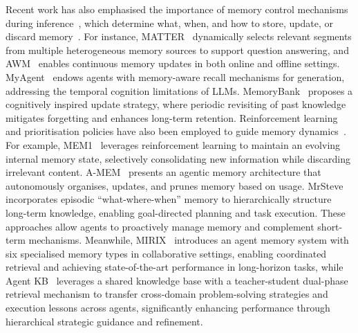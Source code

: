 \documentclass[]{selfevolagent}
\theoremstyle{plain}
\theoremstyle{definition}
\theoremstyle{remark}
\begin{document}
Recent work has also emphasised the importance of memory control mechanisms during inference~\citep{10756271, chen2025improvingfactualityexplicitworking}, which determine what, when, and how to store, update, or discard memory~\citep{jin2025disentanglingmemoryreasoningability}. For instance, MATTER~\citep{lee-etal-2024-matter} dynamically selects relevant segments from multiple heterogeneous memory sources to support question answering, and AWM~\citep{wang2024agentworkflowmemory} enables continuous memory updates in both online and offline settings. MyAgent~\citep{Hou_2024} endows agents with memory-aware recall mechanisms for generation, addressing the temporal cognition limitations of LLMs. MemoryBank~\citep{zhong2023memorybankenhancinglargelanguage} proposes a cognitively inspired update strategy, where periodic revisiting of past knowledge mitigates forgetting and enhances long-term retention. Reinforcement learning and prioritisation policies have also been employed to guide memory dynamics~\citep{zhou2025agentfly,yan2025memory,long2025seeing}. For example, MEM1~\citep{zhou2025mem1learningsynergizememory} leverages reinforcement learning to maintain an evolving internal memory state, selectively consolidating new information while discarding irrelevant content. A-MEM~\citep{xu2025amemagenticmemoryllm} presents an agentic memory architecture that autonomously organises, updates, and prunes memory based on usage. MrSteve~\citep{park2025mrsteveinstructionfollowingagentsminecraft} incorporates episodic ``what-where-when'' memory to hierarchically structure long-term knowledge, enabling goal-directed planning and task execution. These approaches allow agents to proactively manage memory and complement short-term mechanisms. Meanwhile, MIRIX~\citep{wang2025mirixmultiagentmemoryllmbased} introduces an agent memory system with six specialised memory types in collaborative settings, enabling coordinated retrieval and achieving state-of-the-art performance in long-horizon tasks, while Agent KB~\citep{tang2025agent} leverages a shared knowledge base with a teacher-student dual-phase retrieval mechanism to transfer cross-domain problem-solving strategies and execution lessons across agents, significantly enhancing performance through hierarchical strategic guidance and refinement.
\end{document}
